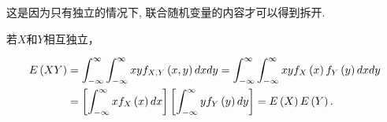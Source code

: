     这是因为只有独立的情况下, 联合随机变量的内容才可以得到拆开. 

    若$X$和$Y$相互独立，
        
        \begin{align}
            E\left(XY\right) &= \int_{-\infty}^{\infty}\int_{-\infty}^{\infty}xyf_{X,Y}\left(x,y\right){d}x{d}y = \int_{-\infty}^{\infty}\int_{-\infty}^{\infty}xyf_X\left(x\right)f_Y\left(y\right){d}x{d}y\notag\\
            & = \left[\int_{-\infty}^{\infty}xf_X\left(x\right){d}x\right]\left[\int_{-\infty}^{\infty}yf_Y\left(y\right){d}y\right] = E\left(X\right)E\left(Y\right).\notag
        \end{align}







